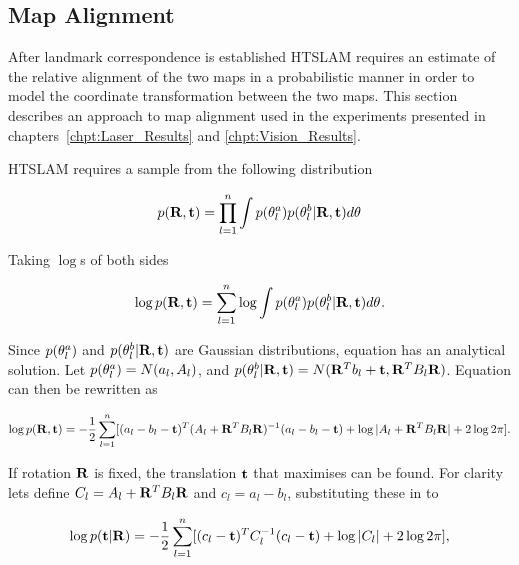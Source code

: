 \subsection{Map Alignment}
\label{sec:map_alignment}

After landmark correspondence is established HTSLAM requires an
estimate of the relative alignment of the two maps in a
probabilistic manner in order to model the coordinate transformation
between the two maps. This section describes an approach to map
alignment used in the experiments presented in
chapters~\ref{chpt:Laser_Results} and \ref{chpt:Vision_Results}.

HTSLAM requires a sample from the following distribution

\begin{equation}
p({\bf R},{\bf t}) = \prod_{l=1}^{n} \int
p(\mape{}{a}{l})p(\mape{}{b}{l}|{\bf R},{\bf t})d\mape{}{}{}
\label{eqn:align_w}
\end{equation}

Taking $\log$s of both sides

\begin{equation}
\log p({\bf R},{\bf t}) = \sum_{l=1}^{n} \log \int
p(\mape{}{a}{l})p(\mape{}{b}{l}|{\bf R},{\bf t})d\mape{}{}{}.
\label{eqn:align_log_w}
\end{equation}

Since $p(\mape{}{a}{l})$ and $p(\mape{}{b}{l}|{\bf R},{\bf t})$ are
Gaussian distributions, equation  has an
analytical solution. Let $p(\mape{}{a}{l}) = N(a_l,A_l)$, and
$p(\mape{}{b}{l}|{\bf R},{\bf t}) = N({\bf R}^Tb_l + {\bf t},{\bf R}^T
B_l {\bf R})$. Equation  can then be
rewritten as

\begin{equation}
\log p({\bf R},{\bf t}) = -\frac{1}{2}\sum_{l=1}^{n}[ (a_l-b_l-{\bf t})^T (A_l + {\bf R}^TB_l{\bf R})^{-1}
(a_l-b_l-{\bf t}) + \log |A_l + {\bf R}^TB_l{\bf R}| + 2\log 2\pi].
\label{eqn:align_log_w_matrix_form}
\end{equation}

If rotation ${\bf R}$ is fixed, the translation ${\bf t}$ that maximises
 can be found. For clarity
lets define $C_l = A_l + {\bf R}^TB_l{\bf R}$ and $c_l = a_l - b_l$,
substituting these in to 

\begin{equation}
\log p({\bf t}|{\bf R}) = -\frac{1}{2}\sum_{l=1}^{n}[ (c_l-{\bf t})^T C_l^{-1}(c_l-{\bf t}) 
+ \log |C_l| + 2 \log 2\pi],
\label{eqn:align_log_w_matrix_form_t0}
\end{equation}

